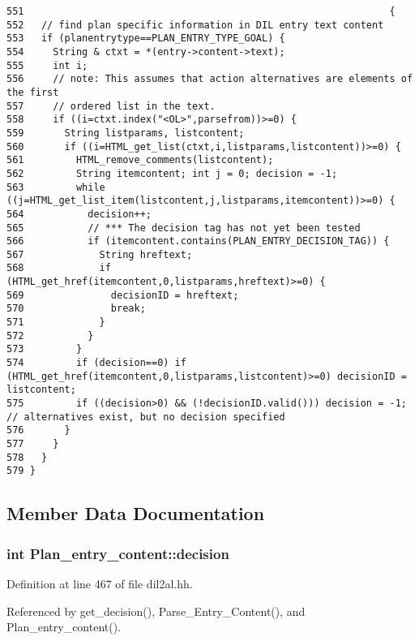 \footnotesize\begin{verbatim}551                                                               {
552   // find plan specific information in DIL entry text content
553   if (planentrytype==PLAN_ENTRY_TYPE_GOAL) {
554     String & ctxt = *(entry->content->text);
555     int i;
556     // note: This assumes that action alternatives are elements of the first
557     // ordered list in the text.
558     if ((i=ctxt.index("<OL>",parsefrom))>=0) {
559       String listparams, listcontent;
560       if ((i=HTML_get_list(ctxt,i,listparams,listcontent))>=0) {
561         HTML_remove_comments(listcontent);
562         String itemcontent; int j = 0; decision = -1;
563         while ((j=HTML_get_list_item(listcontent,j,listparams,itemcontent))>=0) {
564           decision++;
565           // *** The decision tag has not yet been tested
566           if (itemcontent.contains(PLAN_ENTRY_DECISION_TAG)) {
567             String hreftext;
568             if (HTML_get_href(itemcontent,0,listparams,hreftext)>=0) {
569               decisionID = hreftext;
570               break;
571             }
572           }
573         }
574         if (decision==0) if (HTML_get_href(itemcontent,0,listparams,listcontent)>=0) decisionID = listcontent;
575         if ((decision>0) && (!decisionID.valid())) decision = -1; // alternatives exist, but no decision specified
576       }
577     }
578   }
579 }
\end{verbatim}\normalsize 


\subsection{Member Data Documentation}
\subsubsection{\setlength{\rightskip}{0pt plus 5cm}int Plan\_\-entry\_\-content::decision\hspace{0.3cm}{\tt  [protected]}}\label{classPlan__entry__content_n2}




Definition at line 467 of file dil2al.hh.

Referenced by get\_\-decision(), Parse\_\-Entry\_\-Content(), and Plan\_\-entry\_\-content().

